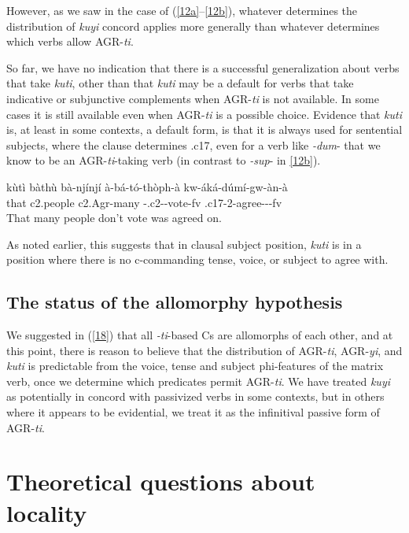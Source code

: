 \documentclass[output=paper,
modfonts
]{langscibook}
\begin{document}
However, as we saw in the case of (\ref{12a}--\ref{12b}), whatever determines the distribution of \textit{kuyi} concord applies more generally than whatever determines which verbs allow AGR-\textit{ti}.

So far, we have no indication that there is a successful generalization about verbs that take \textit{kuti}, other than that \textit{kuti} may be a default for verbs that take indicative or subjunctive complements when AGR-\textit{ti} is not available. In some cases it is still available even when AGR-\textit{ti} is a possible choice. Evidence that \textit{kuti} is, at least in some contexts, a default form, is that it is always used for sentential subjects, where the clause determines .c17, even for a verb like \textit{-dum}- that we know to be an AGR-\textit{ti}-taking verb (in contrast to \textit{-sup}- in \ref{12b}).

\ea\label{n23} \gll kùtì bàthù bà-njínjí à-bá-tó-thòph-à kw-áká-dúmí-gw-àn-à\\
      that c2.people c2.Agr-many -.c2--vote-fv .c17-2-agree---fv\\
	\glt That many people don't vote was agreed on. \z

As noted earlier, this suggests that in clausal subject position, \textit{kuti} is in a position where there is no c-commanding tense, voice, or subject to agree with.


\subsection{The status of the allomorphy hypothesis}

We suggested in (\ref{18}) that all \textit{-ti}-based Cs are allomorphs of each other, and at this point, there is reason to believe that the distribution of AGR-\textit{ti}, AGR-\textit{yi}, and \textit{kuti} is predictable from the voice, tense and subject phi-features of the matrix verb, once we determine which predicates permit AGR-\textit{ti}. We have treated \textit{kuyi} as potentially in concord with passivized verbs in some contexts, but in others where it appears to be evidential, we treat it as the infinitival passive form of AGR-\textit{ti}.

\section{Theoretical questions about locality}
\end{document}

